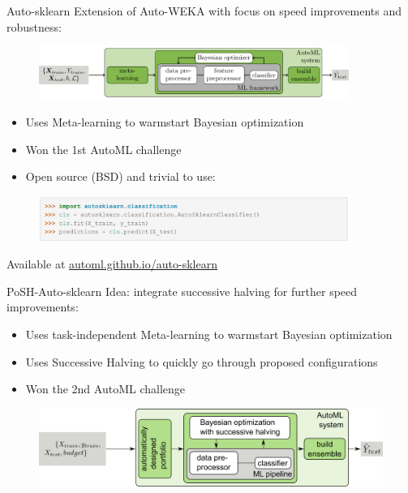\begin{frame}[c]{Auto-sklearn}
Extension of Auto-WEKA with focus on speed improvements and robustness:
\begin{figure}
    \centering
    \includegraphics[width=0.9\textwidth]{images/success_stories/automlworkflow.pdf}
\end{figure}
\begin{itemize}
    \item Uses Meta-learning to warmstart Bayesian optimization
    \item Won the 1st AutoML challenge
    \item Open source (BSD) and trivial to use:
\end{itemize}
\begin{figure}
    \centering
    \includegraphics[width=0.9\textwidth]{images/success_stories/Auto-sklearn_01.png}
\end{figure}
Available at \href{automl.github.io/auto-sklearn}{automl.github.io/auto-sklearn}
\end{frame}


\begin{frame}[c]{PoSH-Auto-sklearn}
Idea: integrate successive halving for further speed improvements:
\begin{itemize}
    \item Uses task-independent Meta-learning to warmstart Bayesian optimization
    \item Uses Successive Halving to quickly go through proposed configurations
    \item Won the 2nd AutoML challenge
\end{itemize}

\begin{figure}
    \centering
    \includegraphics[width=\textwidth]{images/success_stories/automl_bo_po_es.png}
\end{figure}

\hspace{12cm}
\end{frame}

